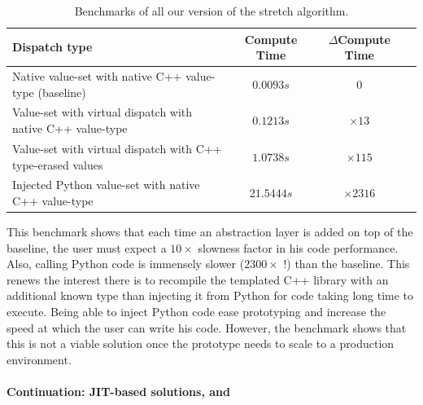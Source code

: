 \begin{table}[htbp]
  \footnotesize
  \centering
  \begin{tabular}{l|ccc}
    \toprule
    Dispatch type                                               &
    Compute Time                                                &
    \(\Delta{}\)Compute Time
    \\ \midrule Native value-set with native C++ value-type (baseline)
                                                                & \(0.0093s\) & \(0\) \\
    Value-set with virtual dispatch with native C++ value-type  &
    \(0.1213s\)                                                 &
    \(\times 13\)
    \\
    Value-set with virtual dispatch with C++ type-erased values &
    \(1.0738s\)                                                 &
    \(\times 115\)
    \\
    Injected Python value-set with native C++ value-type        &
    \(21.5444s\)                                                &
    \(\times 2316\)
    \\
    \bottomrule
  \end{tabular}
  \caption[]{Benchmarks of all our version of the stretch algorithm.}
  \label{summary:table:static.dynamic.perfs}
\end{table}

This benchmark shows that each time an abstraction layer is added on top of the baseline, the user must expect a
\(10\times\) slowness factor in his code performance. Also, calling Python code is immensely slower (\(2300\times\) !)
than the baseline. This renews the interest there is to recompile the templated C++ library with an additional known
type than injecting it from Python for code taking long time to execute. Being able to inject Python code ease
prototyping and increase the speed at which the user can write his code. However, the benchmark shows that this is not a
viable solution once the prototype needs to scale to a production environment.

\paragraph{Continuation: JIT-based solutions, \pros and \cons}

